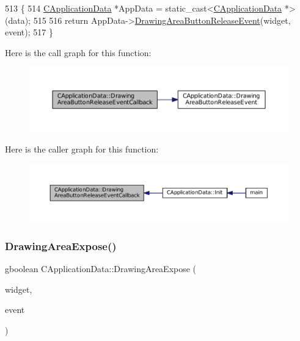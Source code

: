 \begin{DoxyCode}
513                                                                                                            
                  \{
514     \hyperlink{classCApplicationData}{CApplicationData} *AppData = \textcolor{keyword}{static\_cast<}\hyperlink{classCApplicationData}{CApplicationData} *\textcolor{keyword}{>}(data);
515 
516     \textcolor{keywordflow}{return} AppData->\hyperlink{classCApplicationData_a7df4d71ef6fabf7eac740c95cfe3cd81}{DrawingAreaButtonReleaseEvent}(widget, event);
517 \}
\end{DoxyCode}
Here is the call graph for this function\+:\nopagebreak
\begin{figure}[H]
\begin{center}
\leavevmode
\includegraphics[width=350pt]{classCApplicationData_a2708d2083c8c2e7c8de126b40eb17b3f_cgraph}
\end{center}
\end{figure}
Here is the caller graph for this function\+:\nopagebreak
\begin{figure}[H]
\begin{center}
\leavevmode
\includegraphics[width=350pt]{classCApplicationData_a2708d2083c8c2e7c8de126b40eb17b3f_icgraph}
\end{center}
\end{figure}
\hypertarget{classCApplicationData_ae998e896194920e08f69f321f3bc9500}{}\label{classCApplicationData_ae998e896194920e08f69f321f3bc9500} 
\subsubsection{\texorpdfstring{Drawing\+Area\+Expose()}{DrawingAreaExpose()}}
{\footnotesize\ttfamily gboolean C\+Application\+Data\+::\+Drawing\+Area\+Expose (\begin{DoxyParamCaption}\item[{Gtk\+Widget $\ast$}]{widget,  }\item[{Gdk\+Event\+Expose $\ast$}]{event }\end{DoxyParamCaption})\hspace{0.3cm}{\ttfamily [protected]}}



